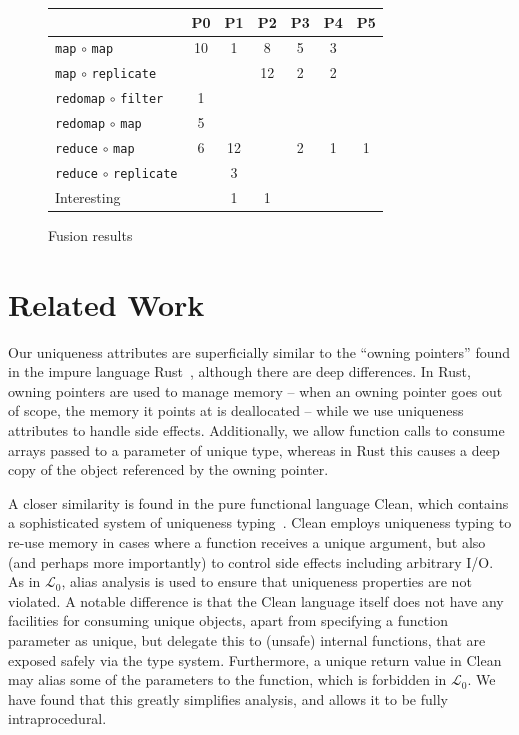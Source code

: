 \documentclass{sigplanconf}  %
\newcommand{\LO}{$\mathcal{L}_0$}
\begin{document}
\begin{figure}
\begin{center}
\begin{tabular}{l|c|c|c|c|c|c}
& P0 & P1 & P2 & P3 & P4 & P5 \\\hline\hline
{\tt map} $\circ$ {\tt map}          & 10 & 1  & 8  & 5 & 3  &   \\\hline
{\tt map} $\circ$ {\tt replicate}    &    &    & 12 & 2 & 2  &   \\\hline
{\tt redomap} $\circ$ {\tt filter}   & 1  &    &    &   &    &   \\\hline
{\tt redomap} $\circ$ {\tt map}      & 5  &    &    &   &    &   \\\hline
{\tt reduce} $\circ$ {\tt map}       & 6  & 12 &    & 2 & 1  & 1 \\\hline
{\tt reduce} $\circ$ {\tt replicate} &    & 3  &    &   &    &   \\\hline\hline
Interesting            &    & 1  & 1  &   &    &   \\
\end{tabular}
\end{center}
\caption{Fusion results}
\label{fig:fusion}
\end{figure}



\section{Related Work}
\label{sec:RelWork}

Our uniqueness attributes are superficially similar to the ``owning
pointers'' found in the impure language Rust~\cite{rust}, although
there are deep differences.  In Rust, owning pointers are used to
manage memory -- when an owning pointer goes out of scope, the memory
it points at is deallocated -- while we use uniqueness attributes to
handle side effects.  Additionally, we allow function calls to consume
arrays passed to a parameter of unique type, whereas in Rust this
causes a deep copy of the object referenced by the owning pointer.

A closer similarity is found in the pure functional language Clean,
which contains a sophisticated system of uniqueness
typing~\cite{barendsen1996uniqueness}.  Clean employs uniqueness
typing to re-use memory in cases where a function receives a unique
argument, but also (and perhaps more importantly) to control side
effects including arbitrary I/O.  As in \LO{}, alias analysis is used
to ensure that uniqueness properties are not violated.  A notable
difference is that the Clean language itself does not have any
facilities for consuming unique objects, apart from specifying a
function parameter as unique, but delegate this to (unsafe) internal
functions, that are exposed safely via the type system.  Furthermore,
a unique return value in Clean may alias some of the parameters to the
function, which is forbidden in \LO{}.  We have found that this
greatly simplifies analysis, and allows it to be fully
intraprocedural.
\end{document}
